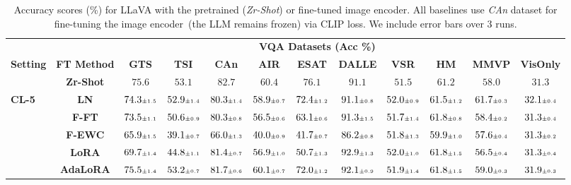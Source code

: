 \begin{table}
\caption{Accuracy scores (\%) for LLaVA with the pretrained (\emph{Zr-Shot}) or fine-tuned image encoder. All baselines use \emph{CAn} dataset for fine-tuning the image encoder~(the LLM remains frozen) via CLIP loss. We include error bars over 3 runs.}
 \label{table:vlm_vqa_acc_counteranimal_clip}
\vskip 0.15in
\begin{center}
\begin{small}
\begingroup
\setlength{\tabcolsep}{3.9pt}
\begin{tabular}{l c c c c c c c c c c c}
\toprule
 & & \multicolumn{9}{c}{\textbf{VQA Datasets (Acc \%)}}  \\
\cmidrule(lr){3-12}
\textbf{Setting} & \textbf{FT Method}  & \textbf{GTS} & \textbf{TSI} & \textbf{CAn} & \textbf{AIR} & \textbf{ESAT} & \textbf{DALLE} & \textbf{VSR} & \textbf{HM} & \textbf{MMVP} & \textbf{VisOnly} \\
\midrule
 & \textbf{Zr-Shot} & $75.6$ & $53.1$ & $82.7$ & $60.4$ & $76.1$ & $91.1$ & $51.5$ & $61.2$ & $58.0$ & $31.3$ \\
\midrule
\multirow{7}{*}{\textbf{CL-5}} & \textbf{LN} & $74.3 \mbox{\tiny\ensuremath{\pm 1.5}}$ & $52.9 \mbox{\tiny\ensuremath{\pm 1.4}}$ & $80.3 \mbox{\tiny\ensuremath{\pm 1.4}}$ & $58.9 \mbox{\tiny\ensuremath{\pm 0.7}}$ & $72.4 \mbox{\tiny\ensuremath{\pm 1.2}}$ & $91.1 \mbox{\tiny\ensuremath{\pm 0.8}}$ & $52.0 \mbox{\tiny\ensuremath{\pm 0.9}}$ & $61.5 \mbox{\tiny\ensuremath{\pm 1.2}}$ & $61.7 \mbox{\tiny\ensuremath{\pm 0.3}}$ & $32.1 \mbox{\tiny\ensuremath{\pm 0.4}}$ \\
& \textbf{F-FT} & $73.5 \mbox{\tiny\ensuremath{\pm 1.1}}$ & $50.6 \mbox{\tiny\ensuremath{\pm 0.9}}$ & $80.3 \mbox{\tiny\ensuremath{\pm 0.8}}$ & $56.5 \mbox{\tiny\ensuremath{\pm 0.6}}$ & $63.1 \mbox{\tiny\ensuremath{\pm 0.6}}$ & $91.3 \mbox{\tiny\ensuremath{\pm 1.5}}$ & $51.7 \mbox{\tiny\ensuremath{\pm 1.4}}$ & $61.8 \mbox{\tiny\ensuremath{\pm 0.8}}$ & $58.4 \mbox{\tiny\ensuremath{\pm 0.2}}$ & $31.3 \mbox{\tiny\ensuremath{\pm 0.4}}$ \\
& \textbf{F-EWC} & $65.9 \mbox{\tiny\ensuremath{\pm 1.5}}$ & $39.1 \mbox{\tiny\ensuremath{\pm 0.7}}$ & $66.0 \mbox{\tiny\ensuremath{\pm 1.3}}$ & $40.0 \mbox{\tiny\ensuremath{\pm 0.9}}$ & $41.7 \mbox{\tiny\ensuremath{\pm 0.7}}$ & $86.2 \mbox{\tiny\ensuremath{\pm 0.8}}$ & $51.8 \mbox{\tiny\ensuremath{\pm 1.3}}$ & $59.9 \mbox{\tiny\ensuremath{\pm 1.0}}$ & $57.6 \mbox{\tiny\ensuremath{\pm 0.4}}$ & $31.3 \mbox{\tiny\ensuremath{\pm 0.2}}$ \\
& \textbf{LoRA} & $69.7 \mbox{\tiny\ensuremath{\pm 1.4}}$ & $44.8 \mbox{\tiny\ensuremath{\pm 1.1}}$ & $81.4 \mbox{\tiny\ensuremath{\pm 0.7}}$ & $56.9 \mbox{\tiny\ensuremath{\pm 1.0}}$ & $50.7 \mbox{\tiny\ensuremath{\pm 1.3}}$ & $92.9 \mbox{\tiny\ensuremath{\pm 1.3}}$ & $52.0 \mbox{\tiny\ensuremath{\pm 1.0}}$ & $61.8 \mbox{\tiny\ensuremath{\pm 1.5}}$ & $56.5 \mbox{\tiny\ensuremath{\pm 0.4}}$ & $31.3 \mbox{\tiny\ensuremath{\pm 0.4}}$ \\
& \textbf{AdaLoRA} & $75.5 \mbox{\tiny\ensuremath{\pm 1.4}}$ & $53.2 \mbox{\tiny\ensuremath{\pm 0.7}}$ & $81.7 \mbox{\tiny\ensuremath{\pm 0.6}}$ & $60.1 \mbox{\tiny\ensuremath{\pm 0.7}}$ & $72.0 \mbox{\tiny\ensuremath{\pm 1.2}}$ & $92.1 \mbox{\tiny\ensuremath{\pm 0.9}}$ & $51.9 \mbox{\tiny\ensuremath{\pm 1.4}}$ & $61.8 \mbox{\tiny\ensuremath{\pm 1.5}}$ & $59.0 \mbox{\tiny\ensuremath{\pm 0.3}}$ & $31.9 \mbox{\tiny\ensuremath{\pm 0.3}}$ \\

\end{tabular}
\end{small}
\end{center}
\end{table}
